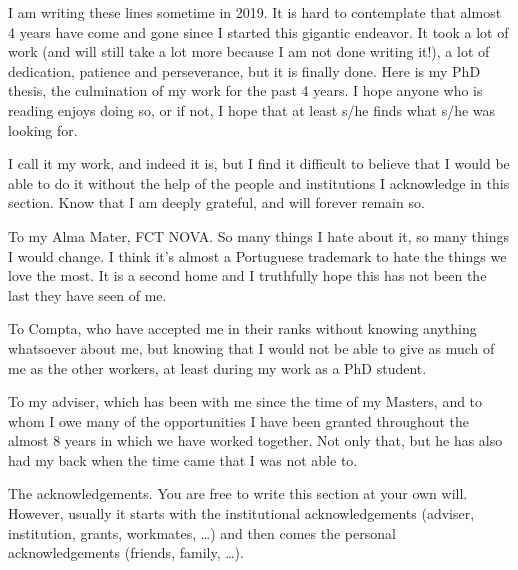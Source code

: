 \acknowledgements

I am writing these lines sometime in 2019. It is hard to contemplate
that almost 4 years have come and gone since I started this gigantic
endeavor. It took a lot of work (and will still take a lot more because
I am not done writing it!), a lot of dedication, patience and
perseverance, but it is finally done. Here is my PhD thesis, the
culmination of my work for the past 4 years. I hope anyone who is
reading enjoys doing so, or if not, I hope that at least s/he finds what
s/he was looking for.

I call it my work, and indeed it is, but I find it difficult to believe
that I would be able to do it without the help of the people and
institutions I acknowledge in this section. Know that I am deeply
grateful, and will forever remain so.

To my Alma Mater, FCT NOVA. So many things I hate about it, so many
things I would change. I think it's almost a Portuguese trademark to
hate the things we love the most. It is a second home and I truthfully
hope this has not been the last they have seen of me.

To Compta, who have accepted me in their ranks without knowing anything
whatsoever about me, but knowing that I would not be able to give as
much of me as the other workers, at least during my work as a PhD
student.

To my adviser, which has been with me since the time of my Masters, and
to whom I owe many of the opportunities I have been granted throughout
the almost 8 years in which we have worked together. Not only that, but
he has also had my back when the time came that I was not able to.



The acknowledgements. You are free to write this section at your own will.  However, usually it starts with the institutional acknowledgements (adviser, institution, grants, workmates, \ldots) and then comes the personal acknowledgements (friends, family, \ldots).

